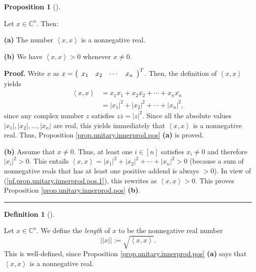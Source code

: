 \documentclass[numbers=enddot,12pt,final,onecolumn,notitlepage]{scrartcl}%
\numberwithin{exer}{subsection}
\theoremstyle{definition}
\newtheorem{prop}[theo]{Proposition}
\newenvironment{proposition}[1][]
{\begin{prop}[#1]\begin{leftbar}}
{\end{leftbar}\end{prop}}
\newtheorem{defi}[theo]{Definition}
\newenvironment{definition}[1][]
{\begin{defi}[#1]\begin{leftbar}}
{\end{leftbar}\end{defi}}
\newenvironment{proof}[1][Proof]{\noindent\textbf{#1.} }{\ \rule{0.5em}{0.5em}}
\begin{document}
\begin{proposition}
\label{prop.unitary.innerprod.pos}Let $x\in\mathbb{C}^{n}$. Then:

\textbf{(a)} The number $\left\langle x,x\right\rangle $ is a nonnegative real.

\textbf{(b)} We have $\left\langle x,x\right\rangle >0$ whenever $x\neq0$.
\end{proposition}

\begin{proof}
Write $x$ as $x=\left(
\begin{array}
[c]{cccc}%
x_{1} & x_{2} & \cdots & x_{n}%
\end{array}
\right)  ^{T}$. Then, the definition of $\left\langle x,x\right\rangle $
yields%
\begin{align}
\left\langle x,x\right\rangle  &  =x_{1}\overline{x_{1}}+x_{2}\overline{x_{2}%
}+\cdots+x_{n}\overline{x_{n}}\nonumber\\
&  =\left\vert x_{1}\right\vert ^{2}+\left\vert x_{2}\right\vert ^{2}%
+\cdots+\left\vert x_{n}\right\vert ^{2},
\label{pf.prop.unitary.innerprod.pos.1}%
\end{align}
since any complex number $z$ satisfies $z\overline{z}=\left\vert z\right\vert
^{2}$. Since all the absolute values $\left\vert x_{1}\right\vert ,\left\vert
x_{2}\right\vert ,\ldots,\left\vert x_{n}\right\vert $ are real, this yields
immediately that $\left\langle x,x\right\rangle $ is a nonnegative real. Thus,
Proposition \ref{prop.unitary.innerprod.pos} \textbf{(a)} is proved.

\textbf{(b)} Assume that $x\neq0$. Thus, at least one $i\in\left[  n\right]  $
satisfies $x_{i}\neq0$ and therefore $\left\vert x_{i}\right\vert ^{2}>0$.
This entails $\left\langle x,x\right\rangle =\left\vert x_{1}\right\vert
^{2}+\left\vert x_{2}\right\vert ^{2}+\cdots+\left\vert x_{n}\right\vert
^{2}>0$ (because a sum of nonnegative reals that has at least one positive
addend is always $>0$). In view of (\ref{pf.prop.unitary.innerprod.pos.1}),
this rewrites as $\left\langle x,x\right\rangle >0$. This proves Proposition
\ref{prop.unitary.innerprod.pos} \textbf{(b)}.
\end{proof}

\begin{definition}
\label{def.unitary.innerprod.len}Let $x\in\mathbb{C}^{n}$. We define the
\emph{length} of $x$ to be the nonnegative real number
\[
\left\vert \left\vert x\right\vert \right\vert :=\sqrt{\left\langle
x,x\right\rangle }.
\]
This is well-defined, since Proposition \ref{prop.unitary.innerprod.pos}
\textbf{(a)} says that $\left\langle x,x\right\rangle $ is a nonnegative real.
\end{definition}
\end{document}

